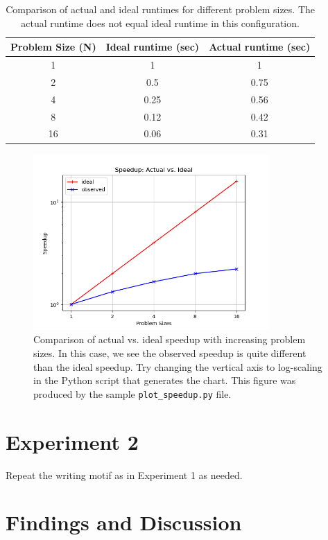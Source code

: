 \begin{table}[t!]
    \centering
    \begin{tabular}{c c c}
        Problem Size (N) & Ideal runtime (sec) & Actual runtime (sec) \\
        \hline
        1 & 1 & 1 \\
        2 & 0.5 & 0.75 \\
        4 & 0.25 & 0.56 \\
        8 & 0.12 & 0.42 \\
        16 & 0.06 & 0.31
    \end{tabular}
    \caption{Comparison of actual and ideal runtimes for different problem sizes. The actual runtime does not equal ideal runtime in this configuration.}
    \label{tab:MyTable1}
\end{table}

\begin{figure}[ht!]
    \centering
    \includegraphics[width=0.8\textwidth]{figures/speedup_plot}
    \caption{Comparison of actual vs. ideal speedup with increasing problem sizes. In this case, we see the observed speedup is quite different than the ideal speedup. Try changing the vertical axis to log-scaling in the Python script that generates the chart. This figure was produced by the sample \texttt{plot\_speedup.py} file.}
    \label{fig:MyPlot1}
\end{figure}

\section{Experiment 2}

Repeat the writing motif as in Experiment 1 as needed.

\section{Findings and Discussion}

